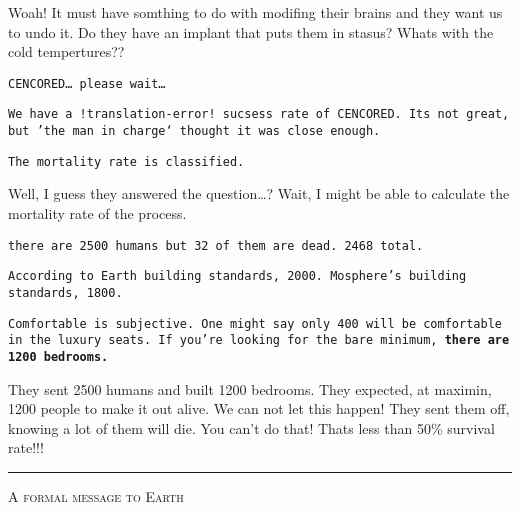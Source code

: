 \documentclass{article}
\begin{document}
Woah! It must have somthing to do with modifing their brains and they want us to
undo it. Do they have an implant that puts them in stasus? Whats with the cold tempertures??


\texttt{CENCORED\ldots{} please wait\ldots}

\texttt{We have a !translation-error! sucsess rate of CENCORED. Its not great, but
'the man in charge` thought it was close enough.}


\texttt{The mortality rate is classified.}

Well, I guess they answered the question\ldots ?
Wait, I might be able to calculate the mortality rate of the process.


\texttt{there are 2500 humans but 32 of them are dead. 2468 total.}


\texttt{According to Earth building standards, 2000.
Mosphere's building standards, 1800.}


\texttt{Comfortable is subjective. One might say only 400 will be comfortable
in the luxury seats. If you're looking for the bare minimum,
\textbf{there are 1200 bedrooms.}}

They sent 2500 humans and built 1200 bedrooms. They expected, at maximin, 1200
people to make it out alive. We can not let this happen! They sent them off, knowing a lot of them
will die. You can't do that! Thats less than 50\% survival rate!!!

\rule{\linewidth}{2pt}

{\centering \large \textsc{A formal message to Earth}\par}
\end{document}
